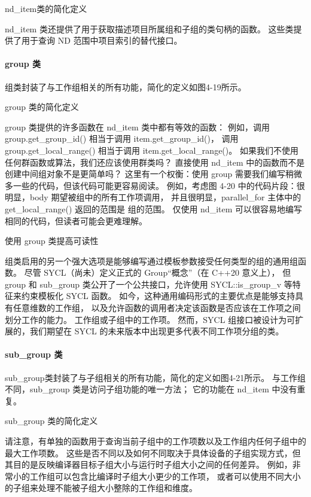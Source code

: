 {\color{red} nd\_item类的简化定义}

nd\_item 类还提供了用于获取描述项目所属组和子组的类句柄的函数。 
这些类提供了用于查询 ND 范围中项目索引的替代接口。

\paragraph{group 类}

组类封装了与工作组相关的所有功能，简化的定义如图4-19所示。

{\color{red} group 类的简化定义}

group 类提供的许多函数在 nd\_item 类中都有等效的函数：
例如，调用 group.get\_group\_id() 相当于调用 item.get\_group\_id()，
调用 group.get\_local\_range() 相当于调用 item.get\_local\_range()。 
如果我们不使用任何群函数或算法，我们还应该使用群类吗？ 直接使用 nd\_item 中的函数而不是创建中间组对象不是更简单吗？ 
这里有一个权衡：使用 group 需要我们编写稍微多一些的代码，但该代码可能更容易阅读。 
例如，考虑图 4-20 中的代码片段：很明显，body 期望被组中的所有工作项调用，
并且很明显，parallel\_for 主体中的 get\_local\_range() 返回的范围是 组的范围。 
仅使用 nd\_item 可以很容易地编写相同的代码，但读者可能会更难理解。

{\color{red} 使用 group 类提高可读性}

组类启用的另一个强大选项是能够编写通过模板参数接受任何类型的组的通用组函数。 
尽管 SYCL（尚未）定义正式的 Group“概念”（在 C++20 意义上），
但 group 和 sub\_group 类公开了一个公共接口，允许使用 SYCL::is\_group\_v 等特征来约束模板化 SYCL 函数。 
如今，这种通用编码形式的主要优点是能够支持具有任意维数的工作组，
以及允许函数的调用者决定该函数是否应该在工作项之间划分工作的能力。 工作组或子组中的工作项。 
然而，SYCL 组接口被设计为可扩展的，我们期望在 SYCL 的未来版本中出现更多代表不同工作项分组的类。

\paragraph{sub\_group 类}

sub\_group类封装了与子组相关的所有功能，简化的定义如图4-21所示。 
与工作组不同，sub\_group 类是访问子组功能的唯一方法； 它的功能在 nd\_item 中没有重复。

{\color{red} sub\_group 类的简化定义}

请注意，有单独的函数用于查询当前子组中的工作项数以及工作组内任何子组中的最大工作项数。 
这些是否不同以及如何不同取决于具体设备的子组实现方式，但其目的是反映编译器目标子组大小与运行时子组大小之间的任何差异。 
例如，非常小的工作组可以包含比编译时子组大小更少的工作项，
或者可以使用不同大小的子组来处理不能被子组大小整除的工作组和维度。

